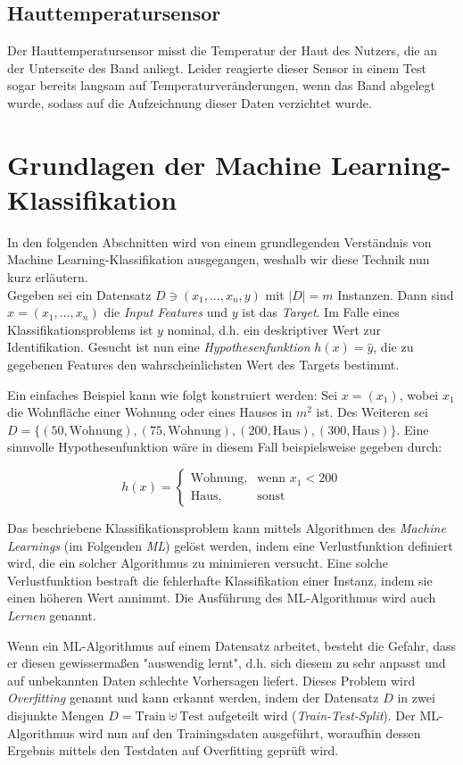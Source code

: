 \subsection{Hauttemperatursensor}
Der Hauttemperatursensor misst die Temperatur der Haut des Nutzers, die an der Unterseite des Band anliegt. Leider reagierte dieser Sensor in einem Test sogar bereits langsam auf Temperaturveränderungen, wenn das Band abgelegt wurde, sodass auf die Aufzeichnung dieser Daten verzichtet wurde.

\section{Grundlagen der Machine Learning-Klassifikation}
In den folgenden Abschnitten wird von einem grundlegenden Verständnis von Machine Learning-Klassifikation ausgegangen, weshalb wir diese Technik nun kurz erläutern. \\
Gegeben sei ein Datensatz $D \ni (x_1, ..., x_n, y)$ mit $|D| = m$ Instanzen. Dann sind $x = (x_1, ..., x_n)$ die \textit{Input Features} und $y$ ist das \textit{Target}. Im Falle eines Klassifikationsproblems ist $y$ nominal, d.h. ein deskriptiver Wert zur Identifikation. Gesucht ist nun eine \textit{Hypothesenfunktion} $h(x) = \hat{y}$, die zu gegebenen Features den wahrscheinlichsten Wert des Targets bestimmt\cite{Ng2011a}.

Ein einfaches Beispiel kann wie folgt konstruiert werden: Sei $x = (x_1)$, wobei $x_1$ die Wohnfläche einer Wohnung oder eines Hauses in $m^2$ ist. Des Weiteren sei $D = \{(50, \text{Wohnung}), (75, \text{Wohnung}), (200, \text{Haus}), (300, \text{Haus})\}$. Eine sinnvolle Hypothesenfunktion wäre in diesem Fall beispielsweise gegeben durch:

\[
h(x) = 
\begin{cases}
\text{Wohnung}, & \text{wenn } x_1 < 200 \\
\text{Haus}, & \text{sonst}
\end{cases}
\]

Das beschriebene Klassifikationsproblem kann mittels Algorithmen des \textit{Machine Learnings} (im Folgenden \textit{ML}) gelöst werden, indem eine Verlustfunktion definiert wird, die ein solcher Algorithmus zu minimieren versucht. Eine solche Verlustfunktion bestraft die fehlerhafte Klassifikation einer Instanz, indem sie einen höheren Wert annimmt. Die Ausführung des ML-Algorithmus wird auch \textit{Lernen} genannt.

Wenn ein ML-Algorithmus auf einem Datensatz arbeitet, besteht die Gefahr, dass er diesen gewissermaßen "auswendig lernt", d.h. sich diesem zu sehr anpasst und auf unbekannten Daten schlechte Vorhersagen liefert. Dieses Problem wird \textit{Overfitting} genannt und kann erkannt werden, indem der Datensatz $D$ in zwei disjunkte Mengen $D = \text{Train} \uplus \text{Test}$ aufgeteilt wird (\textit{Train-Test-Split}). Der ML-Algorithmus wird nun auf den Trainingsdaten ausgeführt, woraufhin dessen Ergebnis mittels den Testdaten auf Overfitting geprüft wird.


